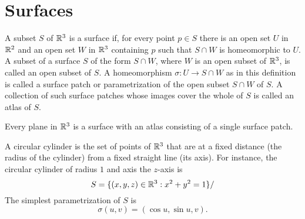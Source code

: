 \section{Surfaces}

\begin{defn}
  A subset $S$ of $\mathbb{R}^3$ is a surface if, for every point $p \in S$
  there is an open set $U$ in $\mathbb{R}^2$ and an open set $W$ in $\mathbb{R}^3$
  containing $p$ such that $S \cap W$ is homeomorphic to $U$.
  A subset of a surface $S$ of the form $S \cap W$, where $W$
  is an open subset of $\mathbb{R}^3$, is called an open subset of $S$.
  A homeomorphism $\sigma: U \to S \cap W$ as in this definition
  is called a surface patch or parametrization of
  the open subset $S \cap W$ of $S$.
  A collection of such surface patches whose images cover the
  whole of $S$ is called an atlas of $S$.
\end{defn}

\begin{example}
  Every plane in $\mathbb{R}^3$ is a surface with an atlas consisting of a single surface patch.
\end{example}

\begin{example}
  A circular cylinder is the set of points of $\mathbb{R}^3$ that are at a fixed distance
  (the radius of the cylinder) from a fixed straight line (its axis).
  For instance, the circular cylinder of radius $1$ and axis the $z$-axis is
  \[
    S = \{(x, y, z) \in \mathbb{R}^3 : x^2 + y^2 = 1\}/
  \]
  The simplest parametrization of $S$ is 
  \[
    \sigma(u, v) = (\cos u, \sin u, v).
  \]
\end{example}

